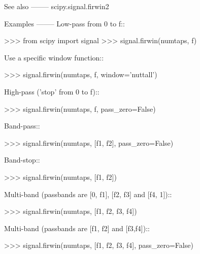\begin{DoxyVerb}
See also
--------
scipy.signal.firwin2

Examples
--------
Low-pass from 0 to f::

>>> from scipy import signal
>>> signal.firwin(numtaps, f)

Use a specific window function::

>>> signal.firwin(numtaps, f, window='nuttall')

High-pass ('stop' from 0 to f)::

>>> signal.firwin(numtaps, f, pass_zero=False)

Band-pass::

>>> signal.firwin(numtaps, [f1, f2], pass_zero=False)

Band-stop::

>>> signal.firwin(numtaps, [f1, f2])

Multi-band (passbands are [0, f1], [f2, f3] and [f4, 1])::

>>> signal.firwin(numtaps, [f1, f2, f3, f4])

Multi-band (passbands are [f1, f2] and [f3,f4])::

>>> signal.firwin(numtaps, [f1, f2, f3, f4], pass_zero=False)\end{DoxyVerb}
 \hypertarget{namespacescipy_1_1signal_1_1fir__filter__design_a67d5b6a50166dbbe76e6de81f63cb44e}{}
